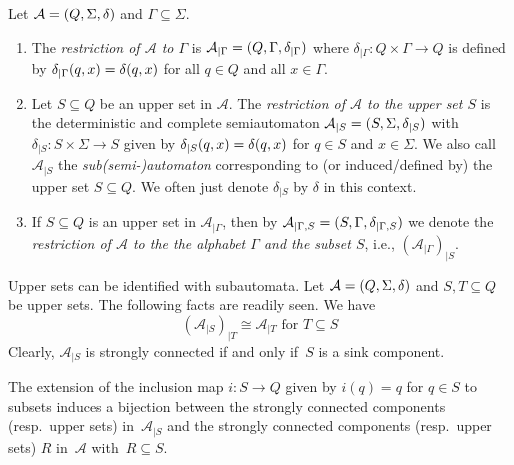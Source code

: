 

Let $\mathcal A = (Q, \Sigma, \delta)$ and $\Gamma \subseteq \Sigma$.

\begin{enumerate}
	
	\item The \emph{restriction of $\mathcal A$ to $\Gamma$} is $\mathcal A_{|\Gamma} = (Q, \Gamma, \delta_{|\Gamma})$
	where $\delta_{|\Gamma} \colon Q \times \Gamma \to Q$
	is defined by $\delta_{|\Gamma}(q,x) = \delta(q,x)$ for all $q \in Q$
	and all $x \in \Gamma$.	\label{def:restriction_Gamma}
	
	\label{def:restriction_aut}
	\item Let $S \subseteq Q$ be an upper set in $\mathcal A$.
	The \emph{restriction of $\mathcal A$ to the upper set $S$}
	is the 
	deterministic and complete semiautomaton $\mathcal A_{|S} = (S, \Sigma, \delta_{|S})$ 
	with $\delta_{|S} \colon S \times \Sigma \to S$
	given by
	$\delta_{|S}(q,x) = \delta(q,x)$
	for $q \in S$ and $x \in \Sigma$.
	We also call~$\mathcal A_{|S}$ the \emph{sub(semi-)automaton} 
	corresponding to (or induced/defined by) the upper set $S \subseteq Q$.
	We often just denote $\delta_{|S}$ by $\delta$ in this context.
		 
	\label{def:restriction_autSGamma}
	\item If $S \subseteq Q$ is an upper set in $\mathcal A_{|\Gamma}$,
	then by %
	$\mathcal A_{|\Gamma, S} = (S, \Gamma, \delta_{|\Gamma, S})$	
	we denote the \emph{restriction of $\mathcal A$ to the the alphabet $\Gamma$ and the subset $S$}, i.e.,
	$(\mathcal A_{|\Gamma})_{|S}$. 
\end{enumerate}

Upper sets can be identified with subautomata. 
Let $\mathcal A = (Q, \Sigma, \delta)$
and $S, T \subseteq Q$ be upper sets. The following facts are readily seen.
We have
\begin{equation} \label{prelim:prop:automata:isos:item:subaut}
	(\mathcal A_{|S})_{|T} \cong \mathcal A_{|T}  \text{ for } T \subseteq S
\end{equation}
Clearly, $\mathcal A_{|S}$ is strongly connected if and only if~$S$
is a sink component.

\begin{proposition}
	\label{prelim:prop:automata:isos:item:corsub}
	The extension of the inclusion map $i \colon S \to Q$
	given by $i(q) = q$ for $q \in S$ to subsets induces
	a bijection between	the strongly connected components (resp.~upper sets) in~$\mathcal A_{|S}$ 
	and the strongly connected components (resp.~upper sets) $R$ in~$\mathcal A$ with~$R \subseteq S$.
\end{proposition}